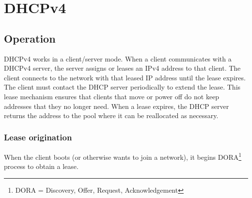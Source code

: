 \chapter{DHCPv4}

\section{Operation}

DHCPv4 works in a client/server mode. When a client communicates with a DHCPv4 server, the server assigns or leases an IPv4 address to that client. The client connects to the network with that leased IP address until the lease expires.\\

The client must contact the DHCP server periodically to extend the lease. This lease mechanism ensures that clients that move or power off do not keep addresses that they no longer need. When a lease expires, the DHCP server returns the address to the pool where it can be reallocated as necessary.\\

\subsection{Lease origination}

When the client boots (or otherwise wants to join a network), it begins DORA\footnote{DORA = Discovery, Offer, Request, Acknowledgement} process to obtain a lease.

